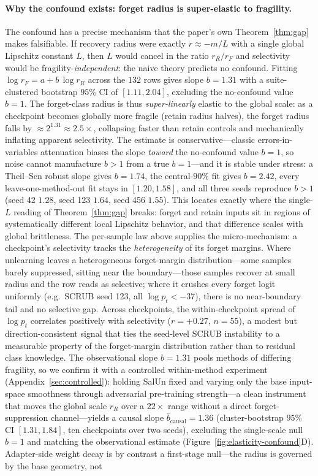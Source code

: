 \documentclass[11pt]{article}
\begin{document}
\paragraph{Why the confound exists: forget radius is super-elastic to fragility.} The confound has a precise mechanism that the paper's own Theorem~\ref{thm:gap} makes falsifiable. If recovery radius were exactly $r \approx -m/L$ with a single global Lipschitz constant $L$, then $L$ would cancel in the ratio $r_R/r_F$ and selectivity would be fragility-\emph{independent}: the naive theory predicts no confound. Fitting $\log r_F = a + b\,\log r_R$ across the $132$ rows gives slope $b = 1.31$ with a suite-clustered bootstrap $95\%$ CI of $[1.11, 2.04]$, excluding the no-confound value $b = 1$. The forget-class radius is thus \emph{super-linearly} elastic to the global scale: as a checkpoint becomes globally more fragile (retain radius halves), the forget radius falls by $\approx 2^{1.31}\!\approx\!2.5\times$, collapsing faster than retain controls and mechanically inflating apparent selectivity. The estimate is conservative---classic errors-in-variables attenuation biases the slope \emph{toward} the no-confound value $b=1$, so noise cannot manufacture $b>1$ from a true $b=1$---and it is stable under stress: a Theil--Sen robust slope gives $b=1.74$, the central-$90\%$ fit gives $b=2.42$, every leave-one-method-out fit stays in $[1.20,1.58]$, and all three seeds reproduce $b>1$ (seed 42 $1.28$, seed 123 $1.64$, seed 456 $1.55$). This locates exactly where the single-$L$ reading of Theorem~\ref{thm:gap} breaks: forget and retain inputs sit in regions of systematically different local Lipschitz behavior, and that difference scales with global brittleness. The per-sample law above supplies the micro-mechanism: a checkpoint's selectivity tracks the \emph{heterogeneity} of its forget margins. Where unlearning leaves a heterogeneous forget-margin distribution---some samples barely suppressed, sitting near the boundary---those samples recover at small radius and the row reads as selective; where it crushes every forget logit uniformly (e.g.\ SCRUB seed 123, all $\log p_t < -37$), there is no near-boundary tail and no selective gap. Across checkpoints, the within-checkpoint spread of $\log p_t$ correlates positively with selectivity ($r=+0.27$, $n=55$), a modest but direction-consistent signal that ties the seed-level SCRUB instability to a measurable property of the forget-margin distribution rather than to residual class knowledge. The observational slope $b=1.31$ pools methods of differing fragility, so we confirm it with a controlled within-method experiment (Appendix~\ref{sec:controlled}): holding SalUn fixed and varying only the base input-space smoothness through adversarial pre-training strength---a clean instrument that moves the global scale $r_R$ over a $22\times$ range without a direct forget-suppression channel---yields a causal slope $\hat b_{\text{causal}} = 1.36$ (cluster-bootstrap $95\%$ CI $[1.31,1.84]$, ten checkpoints over two seeds), excluding the single-scale null $b=1$ and matching the observational estimate (Figure~\ref{fig:elasticity-confound}D). Adapter-side weight decay is by contrast a first-stage null---the radius is governed by the base geometry, not 
\end{document}
